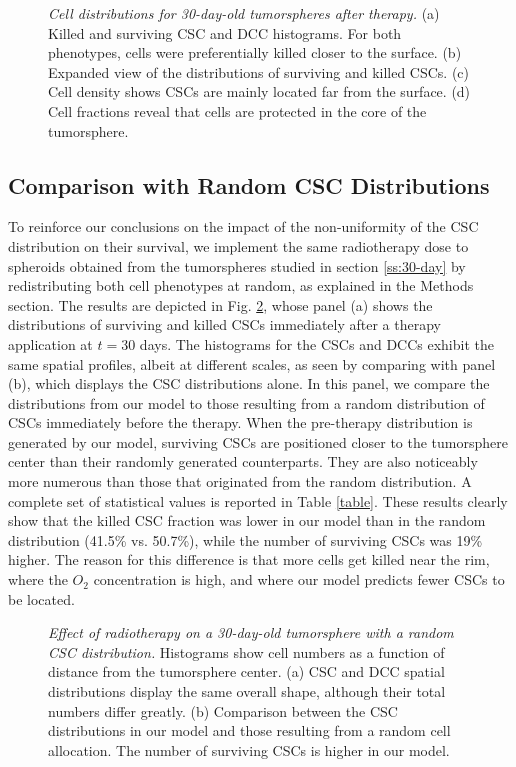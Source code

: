 \documentclass[10pt,letterpaper]{article}
\begin{document}
\begin{figure}
	\centering
	\caption{\emph{Cell distributions for 30-day-old tumorspheres after therapy.}  (a) Killed and surviving CSC and DCC histograms. For both phenotypes, cells were preferentially killed closer to the surface. (b) Expanded view of the distributions of surviving and killed CSCs. (c) Cell density shows CSCs are mainly located far from the surface. (d) Cell fractions reveal that cells are protected in the core of the tumorsphere.}
	\label{f:30}
\end{figure}


\subsection*{Comparison with Random CSC Distributions}

To reinforce our conclusions on the impact of the non-uniformity of the CSC distribution on their survival, we implement the same radiotherapy dose to spheroids obtained from the tumorspheres studied in section \ref{ss:30-day} by redistributing both cell phenotypes at random, as explained in the Methods section. The results are depicted in Fig. \ref{fig:random}, whose panel (a) shows the distributions of surviving and killed CSCs immediately after a therapy application at $t = 30$ days. The histograms for the CSCs and DCCs exhibit the same spatial profiles, albeit at different scales, as seen by comparing with panel (b), which displays the CSC distributions alone. In this panel, we compare the distributions from our model to those resulting from a random distribution of CSCs immediately before the therapy. When the pre-therapy distribution is generated by our model, surviving CSCs are positioned closer to the tumorsphere center than their randomly generated counterparts. They are also noticeably more numerous than those that originated from the random distribution. A complete set of statistical values is reported in Table \ref{table}. These results clearly show that the killed CSC fraction was lower in our model than in the random distribution (41.5\% vs. 50.7\%), while the number of surviving CSCs was 19\% higher. The reason for this difference is that more cells get killed near the rim, where the $O_2$ concentration is high, and where our model predicts fewer CSCs to be located.  


\begin{figure}
	\centering
	\caption{\emph{Effect of radiotherapy on a 30-day-old tumorsphere with a random CSC distribution.} Histograms show cell numbers as a function of distance from the tumorsphere center. (a) CSC and DCC spatial distributions display the same overall shape, although their total numbers differ greatly. (b) Comparison between the CSC distributions in our model and those resulting from a random cell allocation. The number of surviving CSCs is higher in our model.}
	\label{fig:random}
\end{figure}
\end{document}
